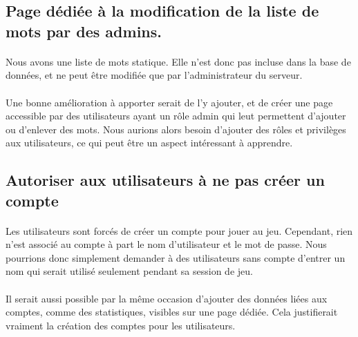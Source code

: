 \documentclass[11pt,a4paper]{article}
\begin{document}
        \subsection*{Page dédiée à la modification de la liste de mots par des admins.}
            \paragraph{}
            Nous avons une liste de mots statique.
            Elle n'est donc pas incluse dans la base de données,
            et ne peut être modifiée que par l'administrateur du serveur.
            \paragraph{}
            Une bonne amélioration à apporter serait de l'y ajouter,
            et de créer une page accessible par des utilisateurs ayant un rôle admin qui leut permettent d'ajouter ou d'enlever des mots.
            Nous aurions alors besoin d'ajouter des rôles et privilèges aux utilisateurs,
            ce qui peut être un aspect intéressant à apprendre.
        \subsection*{Autoriser aux utilisateurs à ne pas créer un compte}
            \paragraph{}
            Les utilisateurs sont forcés de créer un compte pour jouer au jeu.
            Cependant, rien n'est associé au compte à part le nom d'utilisateur et le mot de passe.
            Nous pourrions donc simplement demander à des utilisateurs sans compte d'entrer un nom
            qui serait utilisé seulement pendant sa session de jeu.
            \paragraph{}
            Il serait aussi possible par la même occasion d'ajouter des données liées aux comptes,
            comme des statistiques, visibles sur une page dédiée.
            Cela justifierait vraiment la création des comptes pour les utilisateurs.
\end{document}

